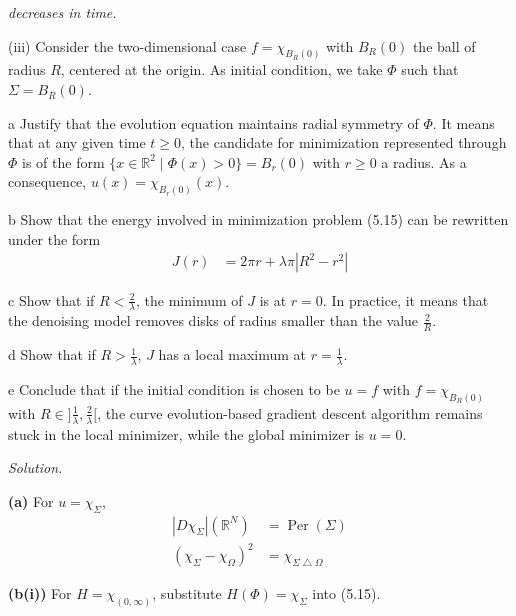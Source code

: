 \documentclass[12pt,letterpaper]{article}
\newcommand{\R}{\mathbb R}
\newenvironment{statement}{\itshape\ignorespaces}{\par}
\newcommand{\solution}{\par\medskip\noindent\textit{Solution.}\enspace}
\newcommand{\partlabel}[1]{\par\medskip\noindent\textbf{(#1)}\enspace}
\begin{document}
\begin{statement}
decreases in time.
\par\smallskip
(iii) Consider the two-dimensional case $f=\chi_{B_R(0)}$ with $B_R(0)$
the ball of radius $R$, centered at the origin. As initial condition, we
take $\Phi$ such that $\Sigma=B_R(0)$.
\par\smallskip
a Justify that the evolution equation maintains radial symmetry of
$\Phi$. It means that at any given time $t\geq0$, the candidate for
minimization represented through $\Phi$ is of the form
$\{x\in\R^2\mid\Phi(x)>0\}=B_r(0)$ with $r\geq0$ a radius.
As a consequence, $u(x)=\chi_{B_r(0)}(x)$.
\par\smallskip
b Show that the energy involved in minimization problem (5.15) can be
rewritten under the form
\begin{align*}
 J(r)&=2\pi r+\lambda\pi|R^2-r^2|
\end{align*}
\par\smallskip
c Show that if $R<\frac2\lambda$, the minimum of $J$ is at $r=0$.
In practice, it means that the denoising model removes disks of radius
smaller than the value $\frac2R$.
\par\smallskip
d Show that if $R>\frac1\lambda$, $J$ has a local maximum at
$r=\frac1\lambda$.
\par\smallskip
e Conclude that if the initial condition is chosen to be $u=f$ with
$f=\chi_{B_R(0)}$ with $R\in]\frac1\lambda,\frac2\lambda[$, the curve
evolution-based gradient descent algorithm remains stuck in the local
minimizer, while the global minimizer is $u=0$.
\end{statement}

\solution
\partlabel{a}
For $u=\chi_\Sigma$,
\begin{align*}
 |D\chi_\Sigma|(\R^N)&=\operatorname{Per}(\Sigma)\\
 (\chi_\Sigma-\chi_\Omega)^2
 &=\chi_{\Sigma\mathbin\triangle\Omega}
\end{align*}

\partlabel{b(i)}
For $H=\chi_{(0,\infty)}$, substitute $H(\Phi)=\chi_\Sigma$ into (5.15).
\end{document}
